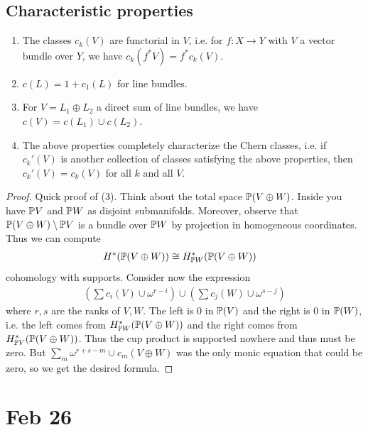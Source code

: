 \documentclass[12pt]{article}
\begin{document}
\subsection{Characteristic properties}
\begin{theorem}
    \begin{enumerate}
        \item The classes $c_k(V)$ are functorial in $V$, i.e. for $f: X \to Y$ with $V$ a vector bundle over $Y$, we have $c_k(f^* V) = f^* c_k(V)$.
        \item $c(L) = 1 + c_1(L)$ for line bundles.
        \item[Whitney sum] For $V = L_1 \oplus L_2$ a direct sum of line bundles, we have $c(V) = c(L_1) \cup c(L_2)$.
        \item The above properties completely characterize the Chern classes, i.e. if $c_k'(V)$ is another collection of classes satisfying the above properties, then $c_k'(V) = c_k(V)$ for all $k$ and all $V$.
    \end{enumerate}
\end{theorem}

\begin{proof}
    Quick proof of (3). Think about the total space $\P(V\oplus W)$. Inside you have $\P V$ and $\P W$ as disjoint submanifolds. Moreover, observe that $\P(V\oplus W) \setminus \P V$ is a bundle over $\P W$ by projection in homogeneous coordinates. Thus we can compute \begin{align*}
        H^*(\P(V\oplus W)) & \cong H^*_{\P W}(\P(V\oplus W))
    \end{align*}
    cohomology with supports. Consider now the expression \begin{align*}
        (\sum c_i(V) \cup \omega^{r-i}) \cup (\sum c_j(W) \cup \omega^{s-j})
    \end{align*}
    where $r,s$ are the ranks of $V,W$. The left is 0 in $\P(V)$ and the right is 0 in $\P(W)$, i.e. the left comes from $H^*_{\P W}(\P(V\oplus W))$ and the right comes from $H^*_{\P V}(\P(V\oplus W))$. Thus the cup product is supported nowhere and thus must be zero. But $\sum_m \omega^{r+s-m} \cup c_m(V\oplus W)$ was the only monic equation that could be zero, so we get the desired formula.
\end{proof}

\section{Feb 26}
\end{document}
